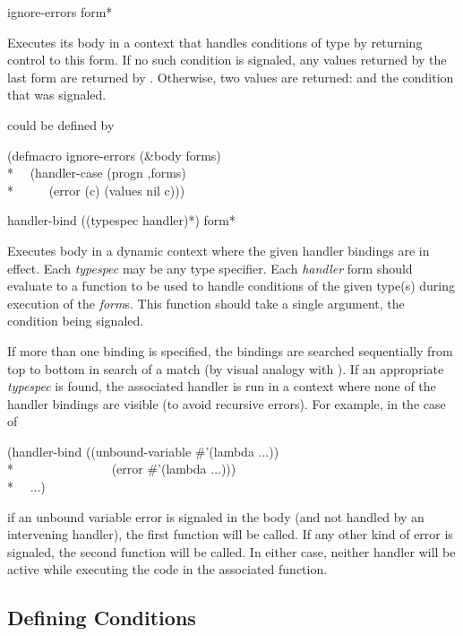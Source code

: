 \begin{defmac}
ignore-errors {form}*

  Executes its body in a context that handles conditions of type  by
  returning control to this form. If no such condition is signaled, any
  values returned by the last form are returned by . Otherwise,
  two values are returned:  and the  condition that was signaled.

 could be defined by
\begin{lisp}
(defmacro ignore-errors (\&body forms) \\*
~~{\Xbq}(handler-case (progn ,{\Xatsign}forms) \\*
~~~~~(error (c) (values nil c)))
\end{lisp}
\end{defmac}


\begin{defmac}
handler-bind ({(typespec handler)}*) {form}*

  Executes body in a dynamic context where the given handler bindings 
  are in effect.
  Each \emph{typespec} may be any type specifier.
  Each \emph{handler} form should evaluate to a function to be used to handle conditions 
  of the given type(s) during execution of the \emph{form\/}s. This function should
  take a single argument, the condition being signaled.

  If more than one binding is specified, the bindings are searched 
  sequentially from top to bottom in search of a match (by visual analogy
  with ). If an appropriate \emph{typespec} is found, the associated handler 
  is run in a context where none of the handler bindings are visible (to avoid
  recursive errors). For example, in the case of
\begin{lisp}
(handler-bind ((unbound-variable \#'(lambda ...)) \\*
~~~~~~~~~~~~~~~(error \#'(lambda ...))) \\*
~~...)
\end{lisp}
  if an unbound variable error is signaled in the body (and not handled
  by an intervening handler), the first function will be called. If any
  other kind of error is signaled, the second function will be called.
  In either case, neither handler will be active while executing the code
  in the associated function.
\end{defmac}


\subsection{Defining Conditions}


